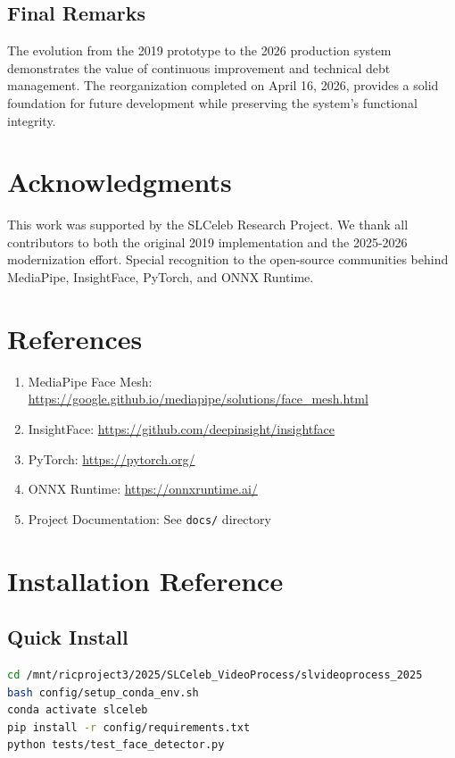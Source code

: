 \documentclass[12pt,a4paper]{article}
\begin{document}
\subsection{Final Remarks}
The evolution from the 2019 prototype to the 2026 production system demonstrates the value of continuous improvement and technical debt management. The reorganization completed on April 16, 2026, provides a solid foundation for future development while preserving the system's functional integrity.

\section*{Acknowledgments}
This work was supported by the SLCeleb Research Project. We thank all contributors to both the original 2019 implementation and the 2025-2026 modernization effort. Special recognition to the open-source communities behind MediaPipe, InsightFace, PyTorch, and ONNX Runtime.

\section*{References}
\begin{enumerate}
\item MediaPipe Face Mesh: \url{https://google.github.io/mediapipe/solutions/face_mesh.html}
\item InsightFace: \url{https://github.com/deepinsight/insightface}
\item PyTorch: \url{https://pytorch.org/}
\item ONNX Runtime: \url{https://onnxruntime.ai/}
\item Project Documentation: See \texttt{docs/} directory
\end{enumerate}

\appendix

\section{Installation Reference}

\subsection{Quick Install}
\begin{lstlisting}[language=bash]
cd /mnt/ricproject3/2025/SLCeleb_VideoProcess/slvideoprocess_2025
bash config/setup_conda_env.sh
conda activate slceleb
pip install -r config/requirements.txt
python tests/test_face_detector.py
\end{lstlisting}
\end{document}
